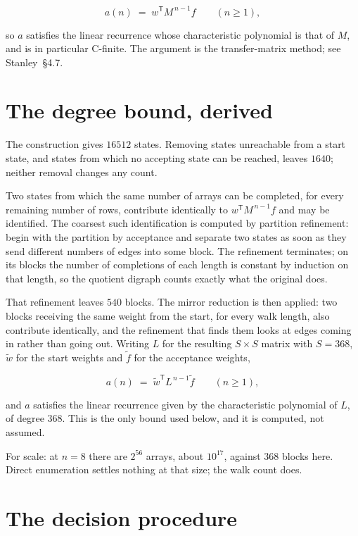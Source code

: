 \documentclass[11pt]{article}
\theoremstyle{definition}
\begin{document}
\[a(n) \;=\; w^{\mathsf T} M^{\,n-1} f \qquad (n \ge 1),\]

so $a$ satisfies the linear recurrence whose characteristic polynomial is that of $M$, and is in particular C-finite. The argument is the transfer-matrix method; see Stanley~\S4.7.

\section{The degree bound, derived}

The construction gives $16512$ states. Removing states unreachable from a start state, and states from which no accepting state can be reached, leaves $1640$; neither removal changes any count.

Two states from which the same number of arrays can be completed, for every remaining number of rows, contribute identically to $w^{\mathsf T}M^{\,n-1}f$ and may be identified. The coarsest such identification is computed by partition refinement: begin with the partition by acceptance and separate two states as soon as they send different numbers of edges into some block. The refinement terminates; on its blocks the number of completions of each length is constant by induction on that length, so the quotient digraph counts exactly what the original does.

That refinement leaves $540$ blocks. The mirror reduction is then applied: two blocks receiving the same weight from the start, for every walk length, also contribute identically, and the refinement that finds them looks at edges coming in rather than going out. Writing $L$ for the resulting $S \times S$ matrix with $S = 368$, $\tilde w$ for the start weights and $\tilde f$ for the acceptance weights,

\[a(n) \;=\; \tilde w^{\mathsf T} L^{\,n-1} \tilde f \qquad (n \ge 1),\]

and $a$ satisfies the linear recurrence given by the characteristic polynomial of $L$, of degree $368$. This is the only bound used below, and it is computed, not assumed.

For scale: at $n = 8$ there are $2^{56}$ arrays, about $10^{17}$, against $368$ blocks here. Direct enumeration settles nothing at that size; the walk count does.

\section{The decision procedure}
\end{document}
